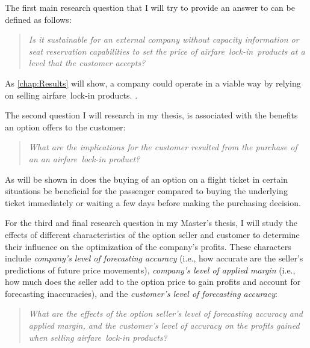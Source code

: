 The first main research question that I will try to provide an answer to can be defined as follows:

\begin{quote}\emph{Is it sustainable for an external company without capacity information or seat reservation capabilities to set the price of airfare~lock-in~products at a level that the customer accepts?}\end{quote}

As \autoref{chap:Results} will show, a company could operate in a viable way by relying on selling airfare~lock-in products. .

The second question I will research in my thesis, is associated with the benefits an option offers to the customer:

\begin{quote}\emph{What are the implications for the customer resulted from the purchase of an an airfare~lock-in product?}\end{quote}

As will be shown in  does the buying of an option on a flight ticket in certain situations be beneficial for the passenger compared to buying the underlying ticket immediately or waiting a few days before making the purchasing decision. 

For the third and final research question in my Master's thesis, I will study the effects of different characteristics of the option seller and customer to determine their influence on the optimization of the company's profits. These characters include \emph{company's level of forecasting accuracy} (i.e., how accurate are the seller's predictions of future price movements), \emph{company's level of applied margin} (i.e., how much does the seller add to the option price to gain profits and account for forecasting inaccuracies), and the \emph{customer's level of forecasting accuracy}:

\begin{quote}\emph{What are the effects of the option seller's level of forecasting accuracy and applied margin, and the customer's level of accuracy on the profits gained when selling airfare~lock-in products?}\end{quote}



